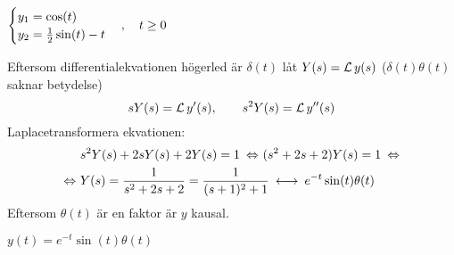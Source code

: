 \begin{task}{5.4}
	\ans 
	$\begin{cases}
	y_1=\cos(t) \\
	y_2=\frac{1}{2}\sin(t)-t
	\end{cases}, \quad t \ge 0$
\end{task}

\begin{task}{5.5}
	Eftersom differentialekvationen högerled är $\delta(t)$ låt $Y(s)=\operatorname{\mathcal{L}} y(s)$ ($\delta(t)\theta(t)$ saknar betydelse)
	\[sY(s)=\operatorname{\mathcal{L}} y'(s),\qquad s^2Y(s)=\operatorname{\mathcal{L}} y''(s)\]
	Laplacetransformera ekvationen:
	\begin{align*}
	&s^2Y(s)+2sY(s)+2Y(s)=1 \lra
	(s^2+2s+2)Y(s)=1\lra \\ \lra
	&Y(s)=\frac{1}{s^2+2s+2}=
	\frac{1}{(s+1)^2+1}\llra
	e^{-t}\sin(t)\theta(t)
	\end{align*}
	Eftersom $\theta(t)$ är en faktor är $y$ kausal.
	
	\ans $y(t)=e^{-t}\sin(t)\theta(t)$
\end{task}

